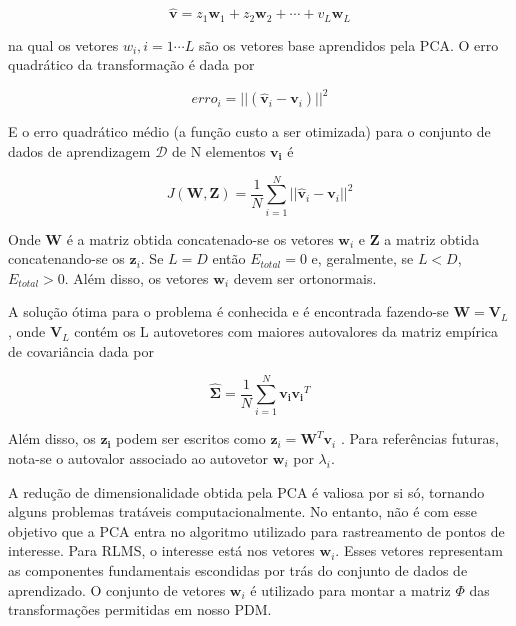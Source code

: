 {\begin{equation}
\mathbf{\hat{v}} = z_1 \mathbf{w}_1 + z_2 \mathbf{w}_2 + \cdots + v_L \mathbf{w}_L
\end{equation}

na qual os vetores $w_i, i = 1 \cdots L$ são os vetores base aprendidos pela
PCA. O erro quadrático da transformação é dada por

\begin{equation}
erro_i = ||(\mathbf{\hat{v}}_{i} - \mathbf{v}_i)||^2
\end{equation}

E o erro quadrático médio (a função custo a ser otimizada) para o conjunto de
dados de aprendizagem $\mathcal{D}$ de N elementos $\mathbf{v_i}$ é

\begin{equation}
J(\mathbf{W}, \mathbf{Z} ) = \frac{1}{N}\sum_{i=1}^N ||\mathbf{\hat{v}}_{i} - \mathbf{v}_i||^2
\end{equation}

Onde $\mathbf{W}$ é a matriz obtida concatenado-se os vetores $\mathbf{w}_i$ e
$\mathbf{Z}$ a matriz obtida concatenando-se os $\mathbf{z}_i$. Se $L = D$ então
$E_{total} = 0$ e, geralmente, se $L < D$, $E_{total} > 0$.  Além disso, os
vetores $\mathbf{w}_i$ devem ser ortonormais.

A solução ótima para o problema é conhecida e é encontrada fazendo-se
$\mathbf{W} = \mathbf{V}_L$, onde $\mathbf{V}_L$ contém os L autovetores com
maiores autovalores da matriz empírica de covariância dada por 

\begin{equation}
\hat{\mathbf{\Sigma}} = \frac{1}{N}\sum_{i=1}^{N} \mathbf{v_i}\mathbf{v_i}^T
\end{equation}

Além disso, os $\mathbf{z_i}$ podem ser escritos como $\mathbf{z}_i =
\mathbf{W}^T \mathbf{v}_i$ \cite{machine-learning-book}. Para referências
futuras, nota-se o autovalor associado ao autovetor $\mathbf{w}_i$ por
$\lambda_i$.

A redução de dimensionalidade obtida pela PCA é valiosa por si só, tornando
alguns problemas tratáveis computacionalmente. No entanto, não é com esse
objetivo que a PCA entra no algoritmo utilizado para rastreamento de pontos de
interesse. Para  RLMS, o interesse está nos vetores $\mathbf{w}_i$. Esses
vetores representam as componentes fundamentais escondidas por trás do conjunto
de dados de aprendizado. O conjunto de vetores $\mathbf{w}_i$ é utilizado para
montar a matriz $\Phi$ das transformações permitidas em nosso PDM.

}
